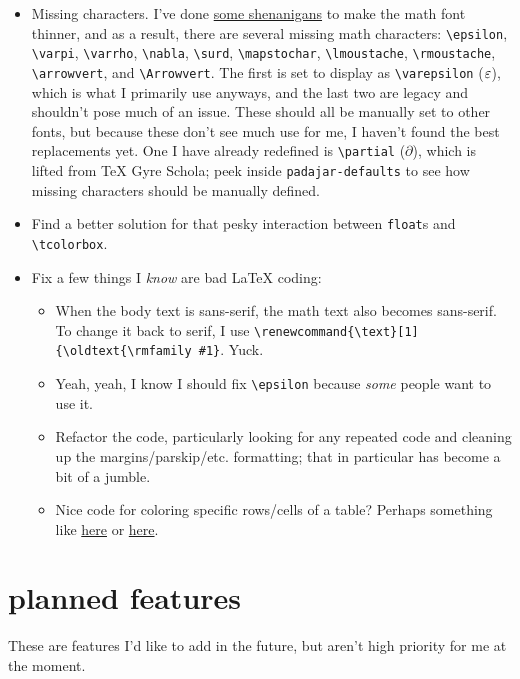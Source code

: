 \documentclass[11pt]{padajar-memo}
\newcommand{\ttslash}[1]{\texttt{\textbackslash #1}}
\begin{document}
\begin{itemize}
	\item Missing characters. I've done \href{https://tex.stackexchange.com/questions/739639/making-ibm-plex-math-thinner/}{some shenanigans} to make the math font thinner, and as a result, there are several missing math characters: \ttslash{epsilon}, \ttslash{varpi}, \ttslash{varrho}, \ttslash{nabla}, \ttslash{surd}, \ttslash{mapstochar}, \ttslash{lmoustache}, \ttslash{rmoustache}, \ttslash{arrowvert}, and \ttslash{Arrowvert}. The first is set to display as \ttslash{varepsilon} ($\varepsilon$), which is what I primarily use anyways, and the last two are legacy and shouldn't pose much of an issue. These should all be manually set to other fonts, but because these don't see much use for me, I haven't found the best replacements yet. One I have already redefined is \ttslash{partial} ($\partial$), which is lifted from \TeX{} Gyre Schola; peek inside \texttt{padajar-defaults} to see how missing characters should be manually defined.
	\item Find a better solution for that pesky interaction between \texttt{float}s and \ttslash{tcolorbox}.
	\item Fix a few things I \textit{know} are bad \LaTeX{} coding:
	\begin{itemize}
		\item When the body text is sans-serif, the math text also becomes sans-serif. To change it back to serif, I use \ttslash{renewcommand\{\textbackslash text\}[1]\{\textbackslash oldtext\{\textbackslash rmfamily \#1\}}. Yuck.
		\item Yeah, yeah, I know I should fix \ttslash{epsilon} because \emph{some} people want to use it.
		\item Refactor the code, particularly looking for any repeated code and cleaning up the margins/parskip/etc. formatting; that in particular has become a bit of a jumble.
		\item Nice code for coloring specific rows/cells of a table? Perhaps something like \href{https://tex.stackexchange.com/questions/213301/efficiently-colouring-block-of-table-cells}{here} or \href{https://tex.stackexchange.com/questions/740514/changing-cell-text-color-for-a-table-included-with-input}{here}.
	\end{itemize}
\end{itemize}

\section{planned features}
These are features I'd like to add in the future, but aren't high priority for me at the moment.
\end{document}

